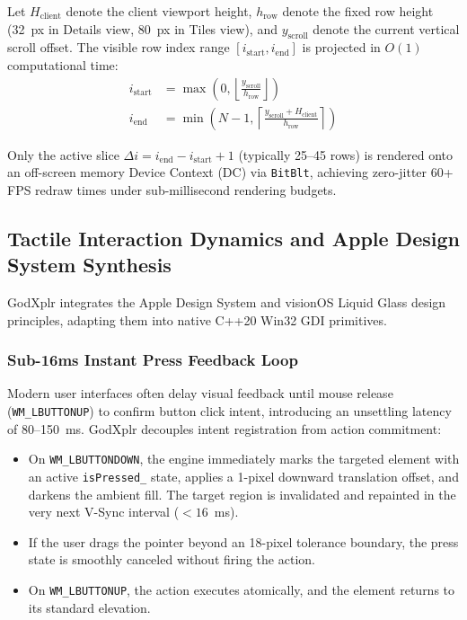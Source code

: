 \documentclass[conference]{IEEEtran}
\begin{document}
Let $H_{\text{client}}$ denote the client viewport height, $h_{\text{row}}$ denote the fixed row height (32~px in Details view, 80~px in Tiles view), and $y_{\text{scroll}}$ denote the current vertical scroll offset. The visible row index range $[i_{\text{start}}, i_{\text{end}}]$ is projected in $O(1)$ computational time:
\begin{align}
i_{\text{start}} &= \max\left(0, \left\lfloor \frac{y_{\text{scroll}}}{h_{\text{row}}} \right\rfloor \right) \\
i_{\text{end}}   &= \min\left(N - 1, \left\lceil \frac{y_{\text{scroll}} + H_{\text{client}}}{h_{\text{row}}} \right\rceil \right)
\end{align}

Only the active slice $\Delta i = i_{\text{end}} - i_{\text{start}} + 1$ (typically 25--45 rows) is rendered onto an off-screen memory Device Context (DC) via \texttt{BitBlt}, achieving zero-jitter 60+ FPS redraw times under sub-millisecond rendering budgets.

\subsection{Tactile Interaction Dynamics and Apple Design System Synthesis}
GodXplr integrates the Apple Design System and visionOS Liquid Glass design principles, adapting them into native C++20 Win32 GDI primitives.

\subsubsection{Sub-16ms Instant Press Feedback Loop}
Modern user interfaces often delay visual feedback until mouse release (\texttt{WM\_LBUTTONUP}) to confirm button click intent, introducing an unsettling latency of 80--150~ms. GodXplr decouples intent registration from action commitment:
\begin{itemize}
    \item On \texttt{WM\_LBUTTONDOWN}, the engine immediately marks the targeted element with an active \texttt{isPressed\_} state, applies a 1-pixel downward translation offset, and darkens the ambient fill. The target region is invalidated and repainted in the very next V-Sync interval ($< 16$~ms).
    \item If the user drags the pointer beyond an 18-pixel tolerance boundary, the press state is smoothly canceled without firing the action.
    \item On \texttt{WM\_LBUTTONUP}, the action executes atomically, and the element returns to its standard elevation.
\end{itemize}
\end{document}
